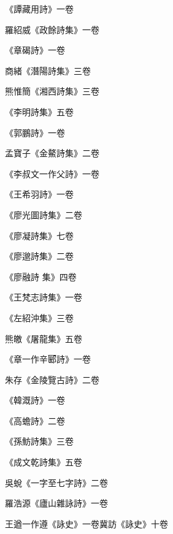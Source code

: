 \begin{pinyinscope}
 《譚藏用詩》一卷



 羅紹威《政餘詩集》一卷



 《章碣詩》一卷



 商緒《潛陽詩集》三卷



 熊惟簡《湘西詩集》三卷



 《李明詩集》五卷



 《郭鵬詩》一卷



 孟寶子《金鰲詩集》二卷



 《李叔文一作父詩》一卷



 《王希羽詩》一卷



 《廖光圖詩集》二卷



 《廖凝詩集》七卷



 《廖邈詩集》二卷



 《廖融詩
 集》四卷



 《王梵志詩集》一卷



 《左紹沖集》三卷



 熊皦《屠龍集》五卷



 《章一作辛郾詩》一卷



 朱存《金陵覽古詩》二卷



 《韓溉詩》一卷



 《高蟾詩》二卷



 《孫魴詩集》三卷



 《成文乾詩集》五卷



 吳蛻《一字至七字詩》二卷



 羅浩源《廬山雜詠詩》一卷



 王遒一作遵《詠史》一卷冀訪《詠史》十卷




\end{pinyinscope}
